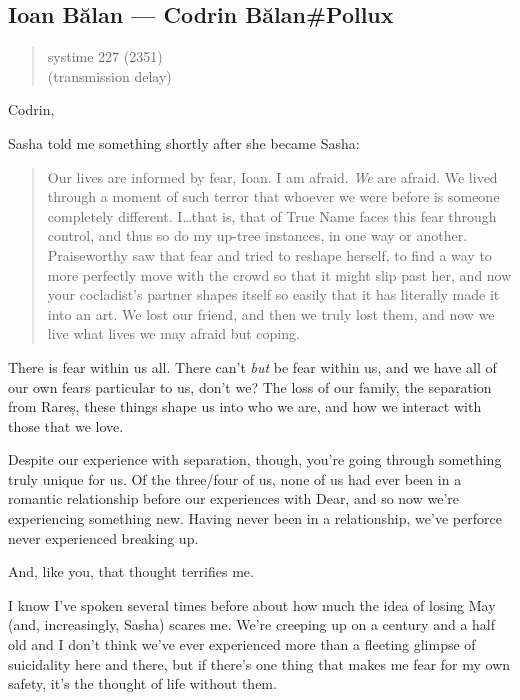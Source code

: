 \hypertarget{ioan-bux103lan-codrin-bux103lanpollux}{%
\subsection{Ioan Bălan — Codrin Bălan\#Pollux}\label{ioan-bux103lan-codrin-bux103lanpollux}}

\begin{quote}
systime 227 (2351)\\
(transmission delay)
\end{quote}

Codrin,

Sasha told me something shortly after she became Sasha:

\begin{quote}
Our lives are informed by fear, Ioan. I am afraid. \emph{We} are afraid. We lived through a moment of such terror that whoever we were before is someone completely different. I\ldots that is, that of True Name faces this fear through control, and thus so do my up-tree instances, in one way or another. Praiseworthy saw that fear and tried to reshape herself, to find a way to more perfectly move with the crowd so that it might slip past her, and now your cocladist's partner shapes itself so easily that it has literally made it into an art. We lost our friend, and then we truly lost them, and now we live what lives we may afraid but coping.
\end{quote}

There is fear within us all. There can't \emph{but} be fear within us, and we have all of our own fears particular to us, don't we? The loss of our family, the separation from Rareș, these things shape us into who we are, and how we interact with those that we love.

Despite our experience with separation, though, you're going through something truly unique for us. Of the three/four of us, none of us had ever been in a romantic relationship before our experiences with Dear, and so now we're experiencing something new. Having never been in a relationship, we've perforce never experienced breaking up.

And, like you, that thought terrifies me.

I know I've spoken several times before about how much the idea of losing May (and, increasingly, Sasha) scares me. We're creeping up on a century and a half old and I don't think we've ever experienced more than a fleeting glimpse of suicidality here and there, but if there's one thing that makes me fear for my own safety, it's the thought of life without them.

